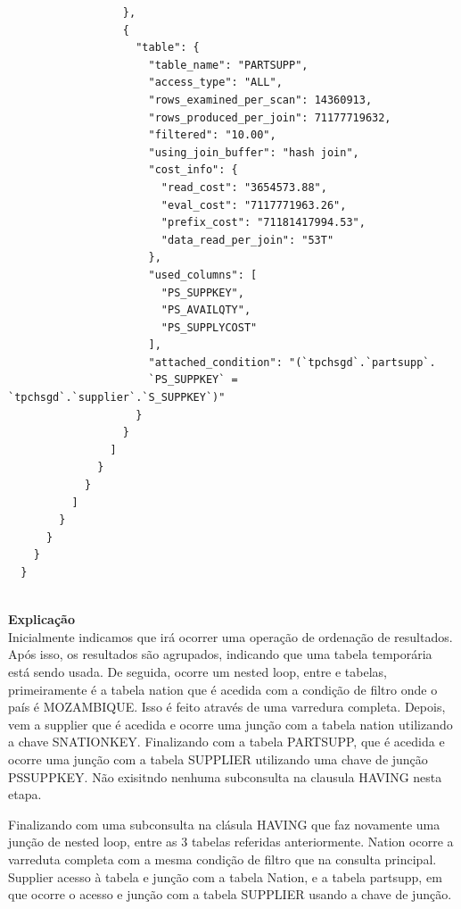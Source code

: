\documentclass{article}
\begin{document}
\begin{lstlisting}
                  },
                  {
                    "table": {
                      "table_name": "PARTSUPP",
                      "access_type": "ALL",
                      "rows_examined_per_scan": 14360913,
                      "rows_produced_per_join": 71177719632,
                      "filtered": "10.00",
                      "using_join_buffer": "hash join",
                      "cost_info": {
                        "read_cost": "3654573.88",
                        "eval_cost": "7117771963.26",
                        "prefix_cost": "71181417994.53",
                        "data_read_per_join": "53T"
                      },
                      "used_columns": [
                        "PS_SUPPKEY",
                        "PS_AVAILQTY",
                        "PS_SUPPLYCOST"
                      ],
                      "attached_condition": "(`tpchsgd`.`partsupp`.
                      `PS_SUPPKEY` = `tpchsgd`.`supplier`.`S_SUPPKEY`)"
                    }
                  }
                ]
              }
            }
          ]
        }
      }
    }
  }
  
\end{lstlisting}

\textbf{Explicação}\\
Inicialmente indicamos que irá ocorrer uma operação de ordenação de resultados.
Após isso, os resultados são agrupados, indicando que uma tabela temporária está sendo usada.
De seguida, ocorre um nested loop, entre e tabelas, primeiramente é a tabela nation que é acedida com a condição de filtro onde o país é MOZAMBIQUE. Isso é feito através de uma varredura completa. Depois, vem a supplier que é acedida e ocorre uma junção com a tabela nation utilizando a chave S\underline{}NATIONKEY. Finalizando com a tabela PARTSUPP, que é acedida e ocorre uma junção com a tabela SUPPLIER utilizando uma chave de junção PS\underline{}SUPPKEY. Não exisitndo nenhuma subconsulta na clausula HAVING nesta etapa.

Finalizando com uma subconsulta na clásula HAVING que faz novamente uma junção de nested loop, entre as 3 tabelas referidas anteriormente. Nation ocorre a varreduta completa com a mesma condição de filtro que na consulta principal. Supplier acesso à tabela e junção com a tabela Nation, e a tabela partsupp, em que ocorre o acesso e junção com a tabela SUPPLIER usando a chave de junção.
\end{document}
